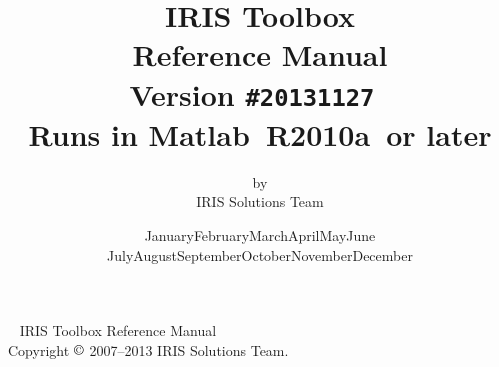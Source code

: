 \documentclass[letterpaper,fleqn,10pt]{article}
\newcommand{\mycmss}{\fontfamily{lcmss}\selectfont}
\newcommand\Today{\number\day\space \ifcase\month\or
  January\or February\or March\or April\or May\or June\or
  July\or August\or September\or October\or November\or December\fi
  \space\number\year}
\newcommand{\irisversion}{20131127}
\newcommand{\matlabversion}{R2010a}
\begin{document}
\thispagestyle{empty}
\title{\vspace*{0.2\textheight}\huge\mdseries IRIS Toolbox\\Reference Manual \\[24pt] \rmfamily \large \mdseries Version \texttt{\#\irisversion}\ \\[6pt]
Runs in Matlab\raisebox{5pt}{\tiny $\copyright$}\ \matlabversion\ or later}
\author{by \\[2pt] IRIS Solutions Team}
\date{\bigskip\bigskip \Today\\[5pt]}
\maketitle
\thispagestyle{empty}
\clearpage

~
\vfill
IRIS Toolbox Reference Manual \\
Copyright $\copyright$ 2007--2013 IRIS Solutions Team.
\thispagestyle{empty}



\clearpage
{}




\clearpage
\tableofcontents

\clearpage
{}

\end{document}
